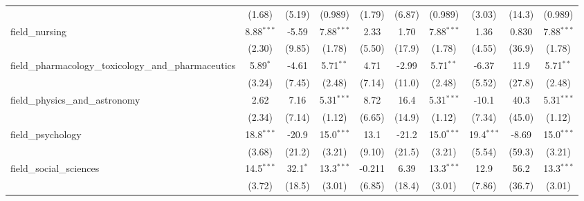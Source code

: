 \begin{tabular}{lccccccccc}
                                                               & (1.68)        & (5.19)        & (0.989)       & (1.79)         & (6.87)         & (0.989)       & (3.03)        & (14.3)        & (0.989)\\   
   field\_nursing                                              & 8.88$^{***}$  & -5.59         & 7.88$^{***}$  & 2.33           & 1.70           & 7.88$^{***}$  & 1.36          & 0.830         & 7.88$^{***}$\\   
                                                               & (2.30)        & (9.85)        & (1.78)        & (5.50)         & (17.9)         & (1.78)        & (4.55)        & (36.9)        & (1.78)\\   
   field\_pharmacology\_toxicology\_and\_pharmaceutics         & 5.89$^{*}$    & -4.61         & 5.71$^{**}$   & 4.71           & -2.99          & 5.71$^{**}$   & -6.37         & 11.9          & 5.71$^{**}$\\   
                                                               & (3.24)        & (7.45)        & (2.48)        & (7.14)         & (11.0)         & (2.48)        & (5.52)        & (27.8)        & (2.48)\\   
   field\_physics\_and\_astronomy                              & 2.62          & 7.16          & 5.31$^{***}$  & 8.72           & 16.4           & 5.31$^{***}$  & -10.1         & 40.3          & 5.31$^{***}$\\   
                                                               & (2.34)        & (7.14)        & (1.12)        & (6.65)         & (14.9)         & (1.12)        & (7.34)        & (45.0)        & (1.12)\\   
   field\_psychology                                           & 18.8$^{***}$  & -20.9         & 15.0$^{***}$  & 13.1           & -21.2          & 15.0$^{***}$  & 19.4$^{***}$  & -8.69         & 15.0$^{***}$\\   
                                                               & (3.68)        & (21.2)        & (3.21)        & (9.10)         & (21.5)         & (3.21)        & (5.54)        & (59.3)        & (3.21)\\   
   field\_social\_sciences                                     & 14.5$^{***}$  & 32.1$^{*}$    & 13.3$^{***}$  & -0.211         & 6.39           & 13.3$^{***}$  & 12.9          & 56.2          & 13.3$^{***}$\\   
                                                               & (3.72)        & (18.5)        & (3.01)        & (6.85)         & (18.4)         & (3.01)        & (7.86)        & (36.7)        & (3.01)\\   

\end{tabular}

